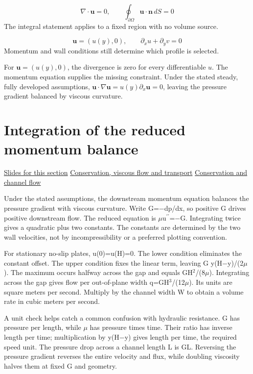 \documentclass[11pt,letterpaper]{article}
\theoremstyle{definition}\newtheorem{definition}{Definition}\newtheorem{example}{Example}
\numberwithin{equation}{section}
\begin{document}
\[
\nabla\!\cdot\mathbf u=0,\qquad \oint_{\partial\Omega}\mathbf u\!\cdot\mathbf n\,dS=0
\]
The integral statement applies to a fixed region with no volume source.

\[
\mathbf u=(u(y),0),\qquad \partial_xu+\partial_yv=0
\]
Momentum and wall conditions still determine which profile is selected.

For $\boldsymbol u=(u(y),0)$, the divergence is zero for every differentiable $u$. The momentum equation supplies the missing constraint. Under the stated steady, fully developed assumptions, $\boldsymbol u\cdot\nabla\boldsymbol u=u(y)\partial_x\boldsymbol u=0$, leaving the pressure gradient balanced by viscous curvature.
\section{Integration of the reduced momentum balance}
\hypertarget{note-integration-of-the-reduced-momentum-balance}{}\label{note:integration-of-the-reduced-momentum-balance}
{\small \href{slides.html\#frame=reduced-momentum\&step=1}{Slides for this section} \quad \href{../modules/cfd/index.html}{Conservation, viscous flow and transport} \quad \href{../modules/animations/conservation-flow.html}{Conservation and channel flow}}\par
Under the stated assumptions, the downstream momentum equation balances the pressure gradient with viscous curvature. Write G=\ensuremath{-}dp/dx, so positive G drives positive downstream flow. The reduced equation is \ensuremath{\mu}u\ensuremath{^{\prime\prime}}=\ensuremath{-}G. Integrating twice gives a quadratic plus two constants. The constants are determined by the two wall velocities, not by incompressibility or a preferred plotting convention.

For stationary no-slip plates, u(0)=u(H)=0. The lower condition eliminates the constant offset. The upper condition fixes the linear term, leaving G y(H\ensuremath{-}y)/(2\ensuremath{\mu}). The maximum occurs halfway across the gap and equals GH\ensuremath{^{2}}/(8\ensuremath{\mu}). Integrating across the gap gives flow per out-of-plane width q=GH\ensuremath{^{3}}/(12\ensuremath{\mu}). Its units are square meters per second. Multiply by the channel width W to obtain a volume rate in cubic meters per second.

A unit check helps catch a common confusion with hydraulic resistance. G has pressure per length, while \ensuremath{\mu} has pressure times time. Their ratio has inverse length per time; multiplication by y(H\ensuremath{-}y) gives length per time, the required speed unit. The pressure drop across a channel length L is GL. Reversing the pressure gradient reverses the entire velocity and flux, while doubling viscosity halves them at fixed G and geometry.
\end{document}
